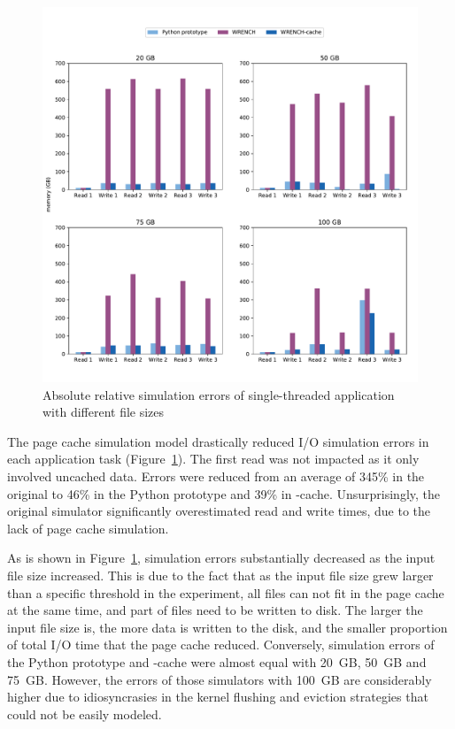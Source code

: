 \begin{figure}[!h]
     \centering
     \includegraphics[width=\linewidth]{figures/single_errors_full.pdf}
     \caption{Absolute relative simulation errors of single-threaded application 
     with different file sizes}
     \label{fig:single_error}
\end{figure}

The page cache simulation model drastically reduced I/O simulation
errors in each application task (Figure~\ref{fig:single_error}). 
The first read was not impacted as it only involved uncached data. 
Errors were reduced from an average of 345\% in the original 
\wrench to 46\% in the Python prototype and 39\% in \wrench-cache. 
Unsurprisingly, the original \wrench simulator significantly overestimated 
read and write times, due to the lack of page cache simulation. 

As is shown in Figure~\ref{fig:single_error}, \wrench simulation errors 
substantially decreased as the input file size increased. 
This is due to the fact that as the input file size grew larger than a specific 
threshold in the experiment, all files can not fit in the page cache at the same time, 
and part of files need to be written to disk. 
The larger the input file size is, the more data is written to the disk, 
and the smaller proportion of total I/O time that the page cache reduced. 
Conversely, simulation errors of the Python prototype and \wrench-cache 
were almost equal with 20~GB, 50~GB and 75~GB. 
However, the errors of those simulators with 100~GB are considerably higher 
due to idiosyncrasies in the kernel flushing and eviction strategies that could 
not be easily modeled.

